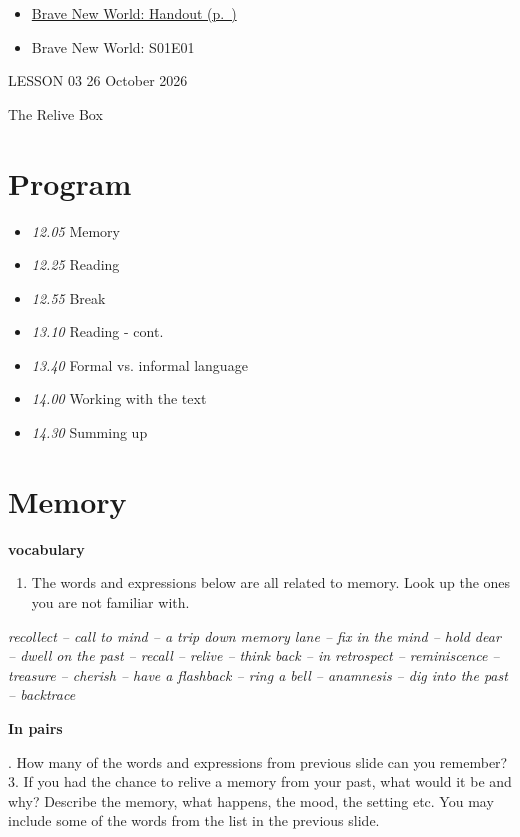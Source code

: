 \documentclass[11pt,a4paper,oneside]{book}
\newcommand{\tasktitle}[1]{{\color{blue}\bfseries #1}\par\smallskip}
\begin{document}
\begin{itemize}
\item \hyperref[worksheet-2]{Brave New World: Handout (p.~\pageref*{worksheet-2})}
\item Brave New World: S01E01
\end{itemize}

\clearpage{}
{\color{blue}\small LESSON 03 \hfill 26 October 2026\par}
\vspace{4mm}
{\displayfont\color{navy}\fontsize{30}{34}\selectfont The Relive Box\par}\vspace{4mm}

\section*{Program}

\begin{itemize}
\item \emph{12.05} Memory
\item \emph{12.25} Reading
\item \emph{12.55} Break
\item \emph{13.10} Reading - cont.
\item \emph{13.40} Formal vs. informal language
\item \emph{14.00} Working with the text
\item \emph{14.30} Summing up
\end{itemize}

\section*{Memory}
\begin{taskbox}
\tasktitle{vocabulary}
\begin{enumerate}
\item The words and expressions below are all related to memory. Look up the ones you are not familiar with.
\end{enumerate}
\emph{recollect – call to mind – a trip down memory lane – fix in the mind – hold dear – dwell on the past – recall – relive – think back – in retrospect – reminiscence – treasure – cherish – have a flashback – ring a bell – anamnesis – dig into the past – backtrace}

\end{taskbox}

\par\medskip{\color{rule}\hrule}\medskip
\begin{taskbox}
\tasktitle{In pairs}
2. How many of the words and expressions from previous slide can you remember?
3. If you had the chance to relive a memory from your past, what would it be and why? Describe the memory, what happens, the mood, the setting etc. You may include some of the words from the list in the previous slide.

\end{taskbox}
\end{document}
